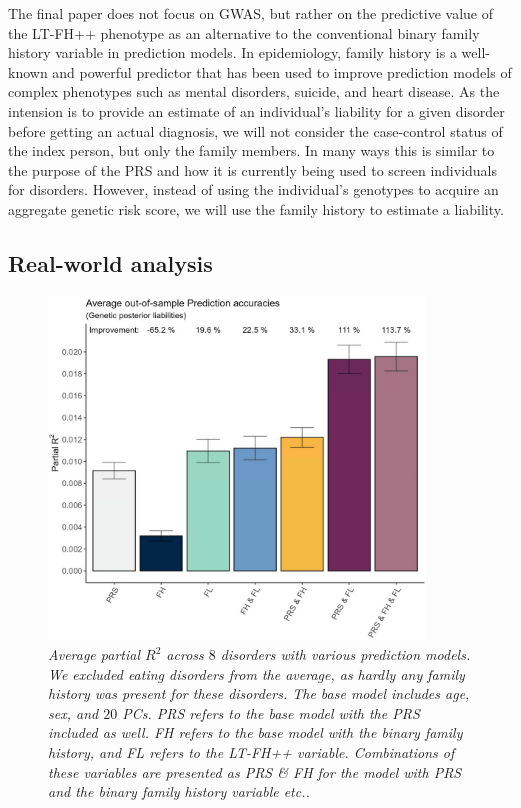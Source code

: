 The final paper does not focus on GWAS, but rather on the predictive value of the LT-FH++ phenotype as an alternative to the conventional binary family history variable in prediction models. In epidemiology, family history is a well-known and powerful predictor that has been used to improve prediction models of complex phenotypes such as mental disorders, suicide, and heart disease. As the intension is to provide an estimate of an individual's liability for a given disorder before getting an actual diagnosis, we will not consider the case-control status of the index person, but only the family members. In many ways this is similar to the purpose of the PRS and how it is currently being used to screen individuals for disorders. However, instead of using the individual's genotypes to acquire an aggregate genetic risk score, we will use the family history to estimate a liability. 

\subsection{Real-world analysis}

\begin{figure}
	\includegraphics[width=10cm]{results/avg_partial_prediciton_accuracies_noED.png}
	\caption[Average out of sample prediction across $ 8 $ disorders]{
		\sl Average partial $ R^2 $ across $ 8 $ disorders with various prediction models. We excluded eating disorders from the average, as hardly any family history was present for these disorders. The base model includes age, sex, and $ 20 $ PCs. \textit{PRS} refers to the base model with the PRS included as well. \textit{FH} refers to the base model with the binary family history, and \textit{FL} refers to the LT-FH++ variable. Combinations of these variables are presented as \textit{PRS} \& \textit{FH} for the model with PRS and the binary family history variable etc..}
	\label{fig:paper3:predictionResults}
\end{figure}

